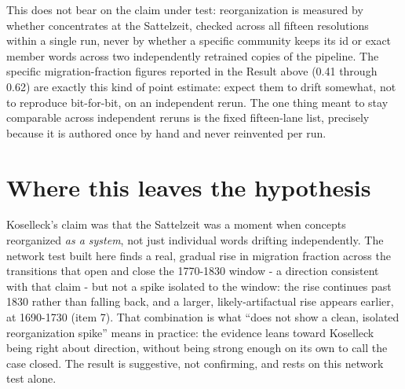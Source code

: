 \documentclass[11pt]{article}
\begin{document}
This does not bear on the claim under
test: reorganization is measured by whether 
concentrates at the Sattelzeit, checked across all fifteen resolutions
within a single run, never by whether a specific community keeps its id
or exact member words across two independently retrained copies of the
pipeline. The specific migration-fraction figures reported in the
Result above (0.41 through 0.62) are exactly this kind of point
estimate: expect them to drift somewhat, not to reproduce bit-for-bit,
on an independent rerun. The one thing meant to stay comparable across independent
reruns is the fixed fifteen-lane list, precisely because it is authored
once by hand and never reinvented per run.

\section{Where this leaves the hypothesis}

Koselleck's claim was that the Sattelzeit was a moment when concepts
reorganized \emph{as a system}, not just individual words drifting
independently. The network test built here finds a real, gradual rise
in migration fraction across the transitions that open and close the
1770-1830 window - a direction consistent with that claim - but not a
spike isolated to the window: the rise continues past 1830 rather than
falling back, and a larger, likely-artifactual rise appears earlier,
at 1690-1730 (item 7). That combination is what ``does not show a
clean, isolated reorganization spike'' means in practice: the evidence
leans toward Koselleck being right about direction, without being
strong enough on its own to call the case closed. The result is
suggestive, not confirming, and rests on this network test alone.
\end{document}
